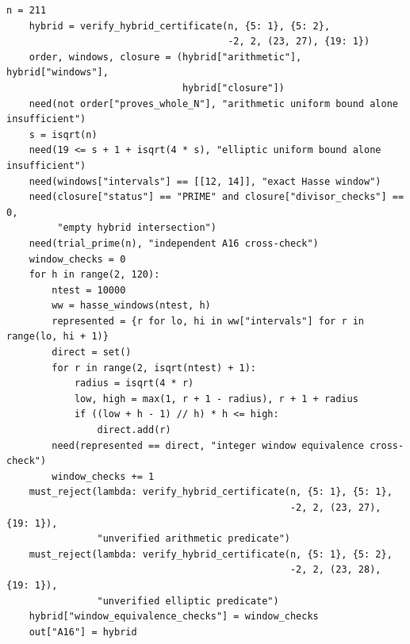 \documentclass[11pt,a4paper]{article}
\theoremstyle{definition}\newtheorem{definition}[theorem]{Definition}
\theoremstyle{remark}\newtheorem{remark}[theorem]{Remark}
\begin{document}
\begin{lstlisting}[label=lst:certificates]
    n = 211
    hybrid = verify_hybrid_certificate(n, {5: 1}, {5: 2},
                                       -2, 2, (23, 27), {19: 1})
    order, windows, closure = (hybrid["arithmetic"], hybrid["windows"],
                               hybrid["closure"])
    need(not order["proves_whole_N"], "arithmetic uniform bound alone insufficient")
    s = isqrt(n)
    need(19 <= s + 1 + isqrt(4 * s), "elliptic uniform bound alone insufficient")
    need(windows["intervals"] == [[12, 14]], "exact Hasse window")
    need(closure["status"] == "PRIME" and closure["divisor_checks"] == 0,
         "empty hybrid intersection")
    need(trial_prime(n), "independent A16 cross-check")
    window_checks = 0
    for h in range(2, 120):
        ntest = 10000
        ww = hasse_windows(ntest, h)
        represented = {r for lo, hi in ww["intervals"] for r in range(lo, hi + 1)}
        direct = set()
        for r in range(2, isqrt(ntest) + 1):
            radius = isqrt(4 * r)
            low, high = max(1, r + 1 - radius), r + 1 + radius
            if ((low + h - 1) // h) * h <= high:
                direct.add(r)
        need(represented == direct, "integer window equivalence cross-check")
        window_checks += 1
    must_reject(lambda: verify_hybrid_certificate(n, {5: 1}, {5: 1},
                                                  -2, 2, (23, 27), {19: 1}),
                "unverified arithmetic predicate")
    must_reject(lambda: verify_hybrid_certificate(n, {5: 1}, {5: 2},
                                                  -2, 2, (23, 28), {19: 1}),
                "unverified elliptic predicate")
    hybrid["window_equivalence_checks"] = window_checks
    out["A16"] = hybrid


\end{lstlisting}
\end{document}
